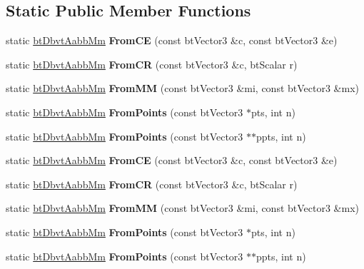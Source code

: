 \subsection*{Static Public Member Functions}
\begin{DoxyCompactItemize}
\item 
\mbox{\label{structbtDbvtAabbMm_a52a6e09165ec39384a06d69630e88b53}} 
static \hyperlink{structbtDbvtAabbMm}{bt\+Dbvt\+Aabb\+Mm} {\bfseries From\+CE} (const bt\+Vector3 \&c, const bt\+Vector3 \&e)
\item 
\mbox{\label{structbtDbvtAabbMm_a6b9b2b5b6361d2b56285ce18733e2092}} 
static \hyperlink{structbtDbvtAabbMm}{bt\+Dbvt\+Aabb\+Mm} {\bfseries From\+CR} (const bt\+Vector3 \&c, bt\+Scalar r)
\item 
\mbox{\label{structbtDbvtAabbMm_a421d031c65294920c84fbde27ab3ceca}} 
static \hyperlink{structbtDbvtAabbMm}{bt\+Dbvt\+Aabb\+Mm} {\bfseries From\+MM} (const bt\+Vector3 \&mi, const bt\+Vector3 \&mx)
\item 
\mbox{\label{structbtDbvtAabbMm_a7fc02287ebb84bce64a346e4414d6280}} 
static \hyperlink{structbtDbvtAabbMm}{bt\+Dbvt\+Aabb\+Mm} {\bfseries From\+Points} (const bt\+Vector3 $\ast$pts, int n)
\item 
\mbox{\label{structbtDbvtAabbMm_ac2d61085ef2aa7900e38fcb9fc63c5a5}} 
static \hyperlink{structbtDbvtAabbMm}{bt\+Dbvt\+Aabb\+Mm} {\bfseries From\+Points} (const bt\+Vector3 $\ast$$\ast$ppts, int n)
\item 
\mbox{\label{structbtDbvtAabbMm_a90d5dfec604c94c1963a1de7d56ad288}} 
static \hyperlink{structbtDbvtAabbMm}{bt\+Dbvt\+Aabb\+Mm} {\bfseries From\+CE} (const bt\+Vector3 \&c, const bt\+Vector3 \&e)
\item 
\mbox{\label{structbtDbvtAabbMm_a9e261943311eadb1fc735434a9f53d2c}} 
static \hyperlink{structbtDbvtAabbMm}{bt\+Dbvt\+Aabb\+Mm} {\bfseries From\+CR} (const bt\+Vector3 \&c, bt\+Scalar r)
\item 
\mbox{\label{structbtDbvtAabbMm_a9536fe38e6539f8f5fa9e103c5112e52}} 
static \hyperlink{structbtDbvtAabbMm}{bt\+Dbvt\+Aabb\+Mm} {\bfseries From\+MM} (const bt\+Vector3 \&mi, const bt\+Vector3 \&mx)
\item 
\mbox{\label{structbtDbvtAabbMm_a8e3283c18bc0d683d8662456f112075a}} 
static \hyperlink{structbtDbvtAabbMm}{bt\+Dbvt\+Aabb\+Mm} {\bfseries From\+Points} (const bt\+Vector3 $\ast$pts, int n)
\item 
\mbox{\label{structbtDbvtAabbMm_acc7411b0ebff4b067c95ed1574cefda6}} 
static \hyperlink{structbtDbvtAabbMm}{bt\+Dbvt\+Aabb\+Mm} {\bfseries From\+Points} (const bt\+Vector3 $\ast$$\ast$ppts, int n)
\end{DoxyCompactItemize}
